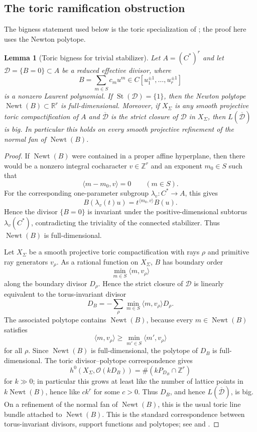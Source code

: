 \documentclass[11pt]{amsart}
\def\CC{C}%
\numberwithin{equation}{section}
\newtheorem{lemma}[theorem]{Lemma}
\theoremstyle{definition}
\theoremstyle{remark}
\newcommand{\CC}{\mathbb C}
\newcommand{\RR}{\mathbb R}
\newcommand{\ZZ}{\mathbb Z}
\newcommand{\St}{\operatorname{St}}
\newcommand{\Newt}{\operatorname{Newt}}
\begin{document}
\subsection{The toric ramification obstruction}

The bigness statement used below is the toric specialization of \cite[Proposition~3.9(ii)]{NoguchiWinkelmannYamanoi2008SMTII}; the proof here uses the Newton polytope.

\begin{lemma}[Toric bigness for trivial stabilizer]\label{lem:toric-bigness}
Let $A=(\CC^*)^r$ and let $\mathcal D=\{B=0\}\subset A$ be a reduced effective divisor, where
\[
B=\sum_{m\in S}c_m u^m\in\CC[u_1^{\pm1},\dots,u_r^{\pm1}]
\]
is a nonzero Laurent polynomial.  If $\St(\mathcal D)=\{1\}$, then the Newton polytope $\Newt(B)\subset\RR^r$ is full-dimensional.  Moreover, if $X_\Sigma$ is any smooth projective toric compactification of $A$ and $\overline{\mathcal D}$ is the strict closure of $\mathcal D$ in $X_\Sigma$, then $L(\overline{\mathcal D})$ is big.  In particular this holds on every smooth projective refinement of the normal fan of $\Newt(B)$.
\end{lemma}

\begin{proof}
If $\Newt(B)$ were contained in a proper affine hyperplane, then there would be a nonzero integral cocharacter $v\in\ZZ^r$ and an exponent $m_0\in S$ such that
\[
\langle m-m_0,v\rangle=0\qquad(m\in S).
\]
For the corresponding one-parameter subgroup $\lambda_v:\CC^*\to A$, this gives
\[
B(\lambda_v(t)u)=t^{\langle m_0,v\rangle}B(u).
\]
Hence the divisor $\{B=0\}$ is invariant under the positive-dimensional subtorus $\lambda_v(\CC^*)$, contradicting the triviality of the connected stabilizer. Thus $\Newt(B)$ is full-dimensional.

Let $X_\Sigma$ be a smooth projective toric compactification with rays $\rho$ and primitive ray generators $v_\rho$.  As a rational function on $X_\Sigma$, $B$ has boundary order
\[
\min_{m\in S}\langle m,v_\rho\rangle
\]
along the boundary divisor $D_\rho$.  Hence the strict closure of $\mathcal D$ is linearly equivalent to the torus-invariant divisor
\[
D_B=-\sum_\rho \min_{m\in S}\langle m,v_\rho\rangle D_\rho .
\]
The associated polytope contains $\Newt(B)$, because every $m\in\Newt(B)$ satisfies
\[
\langle m,v_\rho\rangle\ge \min_{m'\in S}\langle m',v_\rho\rangle
\]
for all $\rho$.  Since $\Newt(B)$ is full-dimensional, the polytope of $D_B$ is full-dimensional.  The toric divisor--polytope correspondence gives
\[
h^0(X_\Sigma,\mathcal O(kD_B))
=\#(kP_{D_B}\cap\ZZ^r)
\]
for $k\gg0$; in particular this grows at least like the number of lattice points in $k\Newt(B)$, hence like $c k^r$ for some $c>0$.  Thus $D_B$, and hence $L(\overline{\mathcal D})$, is big.  On a refinement of the normal fan of $\Newt(B)$, this is the usual toric line bundle attached to $\Newt(B)$.  This is the standard correspondence between torus-invariant divisors, support functions and polytopes; see \cite[\S~3.4]{Fulton1993Toric} and \cite[Proposition~4.3.3 and Ch.~9]{CoxLittleSchenck2011Toric}.
\end{proof}
\end{document}
